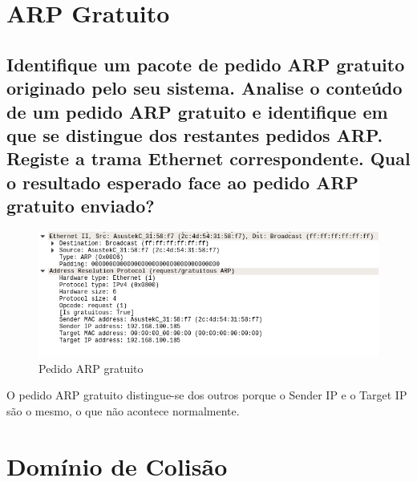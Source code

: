 \documentclass[a4paper]{article}
\begin{document}
\section{ARP Gratuito}
\setcounter{subsection}{15}

\subsection{Identifique um pacote de pedido ARP gratuito originado pelo seu sistema. Analise o conteúdo de um pedido ARP gratuito e identifique em que se distingue dos  restantes  pedidos  ARP. Registe a trama Ethernet correspondente. Qual o resultado esperado face ao pedido ARP gratuito enviado?}
\begin{figure}[H]
\centering
\includegraphics[scale=0.50]{pics/p162.png}
\caption{Pedido ARP gratuito} %
\end{figure}
O pedido ARP gratuito distingue-se dos outros porque o Sender IP e o Target IP são o mesmo, o que não acontece normalmente.


\section{Domínio de Colisão}
\setcounter{subsection}{16}
\end{document}
